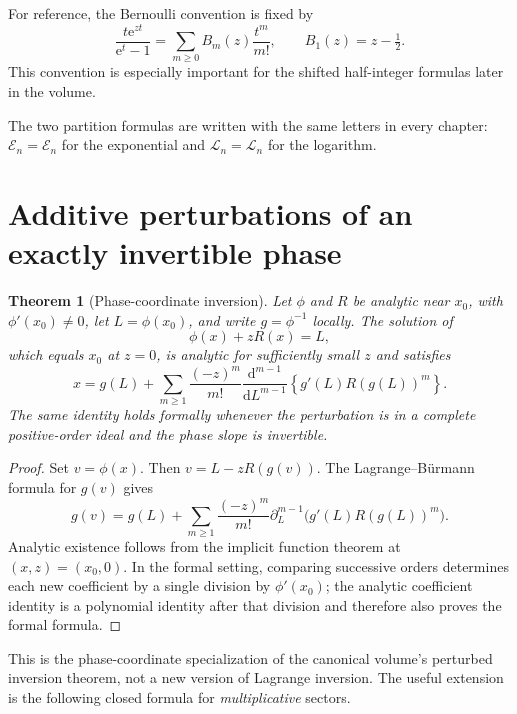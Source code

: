 \documentclass[11pt,openany]{book}
\numberwithin{equation}{chapter}
\theoremstyle{plain}
\newtheorem{theorem}{Theorem}[chapter]
\theoremstyle{definition}
\theoremstyle{remark}
\newcommand{\ee}{\mathrm e}
\newcommand{\ddn}{\mathrm d}                  %
\newcommand{\ExpC}{\mathcal E}\newcommand{\LogC}{\mathcal L}
\newcommand{\cE}{\mathcal E}\newcommand{\cL}{\mathcal L}
\begin{document}
For reference, the Bernoulli convention is fixed by
\[
 \frac{t\ee^{zt}}{\ee^t-1}=\sum_{m\ge0}B_m(z)\frac{t^m}{m!},
 \qquad B_1(z)=z-\tfrac12.
\]
This convention is especially important for the shifted half-integer formulas later in the volume.

The two partition formulas are written with the same letters in every
chapter: $\ExpC_n=\cE_n$ for the exponential and $\LogC_n=\cL_n$ for the
logarithm.

\section{Additive perturbations of an exactly invertible phase}
\label{ct:sec:phase}

\begin{theorem}[Phase-coordinate inversion]
\label{t1:thm:phase}
Let $\phi$ and $R$ be analytic near $x_0$, with $\phi'(x_0)\ne0$, let $L=\phi(x_0)$, and write $g=\phi^{-1}$ locally. The solution of
\[
 \phi(x)+zR(x)=L,
\]
which equals $x_0$ at $z=0$, is analytic for sufficiently small $z$ and satisfies
\begin{equation}
 x=g(L)+\sum_{m\ge1}\frac{(-z)^m}{m!}
 \frac{\ddn^{m-1}}{\ddn L^{m-1}}
 \left\{g'(L)R(g(L))^m\right\}.
 \label{t1:eq:phaseinv}
\end{equation}
The same identity holds formally whenever the perturbation is in a complete positive-order ideal and the phase slope is invertible.
\end{theorem}
\begin{proof}
Set $v=\phi(x)$. Then $v=L-zR(g(v))$. The Lagrange--B\"urmann formula for $g(v)$ gives
\[
 g(v)=g(L)+\sum_{m\ge1}\frac{(-z)^m}{m!}
 \partial_L^{m-1}\bigl(g'(L)R(g(L))^m\bigr).
\]
Analytic existence follows from the implicit function theorem at $(x,z)=(x_0,0)$. In the formal setting, comparing successive orders determines each new coefficient by a single division by $\phi'(x_0)$; the analytic coefficient identity is a polynomial identity after that division and therefore also proves the formal formula.
\end{proof}

This is the phase-coordinate specialization of the canonical volume's perturbed inversion theorem, not a new version of Lagrange inversion. The useful extension is the following closed formula for \emph{multiplicative} sectors.
\end{document}
